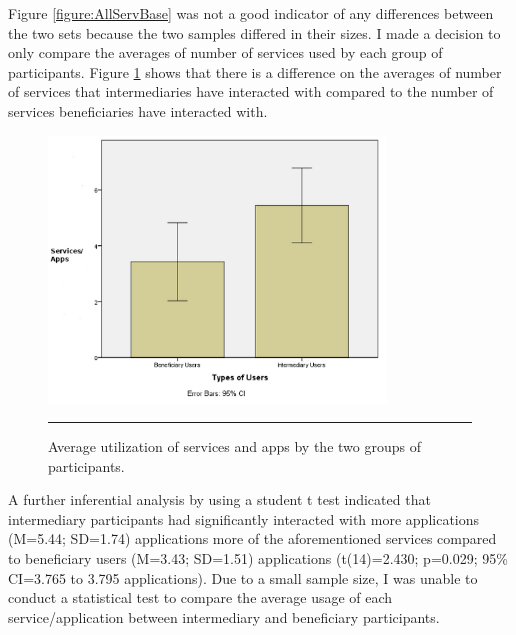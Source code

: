 Figure \ref{figure:AllServBase} was not a good indicator of any differences between the two sets because the two samples differed in their sizes. I made a decision to only compare the averages of number of services used by each group of participants. Figure \ref{figure:AvgServBase}  shows that there is a difference on the averages of number of services that intermediaries have interacted with compared to the number of services beneficiaries have interacted with.
\begin{figure}[htbp]
  \centering
    \includegraphics[width=0.8\textwidth]{Figures/ServicesBaseline.png}
    \rule{35em}{0.5pt}
  \caption{Average utilization of services and apps by the two groups of participants.}
  \label{figure:AvgServBase}
\end{figure}
A further inferential analysis by using a student t test indicated that intermediary participants had significantly interacted with more applications (M=5.44; SD=1.74) applications more of the aforementioned services compared to beneficiary users (M=3.43; SD=1.51) applications (t(14)=2.430; p=0.029; 95\% CI=3.765 to 3.795 applications). Due to a small sample size, I was unable to conduct a statistical test to compare the average usage of each service/application between intermediary and beneficiary participants.\newline
